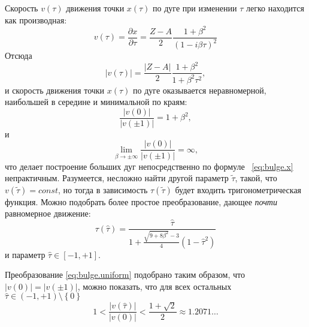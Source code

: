 Скорость $v(\tau)$
движения точки $x(\tau)$
по дуге при изменении $\tau$
легко находится как производная:
$$
v(\tau) =
  \frac{\partial x}{\partial \tau} =
  \frac{Z-A}{2}\frac{1+\beta^2}{\left(1 - i \beta \tau \right)^2}
$$
Отсюда
$$
|v(\tau)| =
  \frac{\left|Z-A\right|}{2}\frac{1+\beta^2}{1 + \beta^2 \tau^2}
  ,
$$
и скорость движения точки $x(\tau)$
по дуге оказывается неравномерной,
наибольшей в середине
и минимальной по краям:
$$
\frac{|v(0)|}{|v(\pm1)|} = 1+\beta^2
,
$$
и
$$
\lim_{\beta \to \pm \infty}
  \frac{|v(0)|}{|v(\pm1)|} =
  \infty
  ,
$$
что делает построение больших дуг непосредственно по формуле~
\eqref{eq:bulge.x}
непрактичным.
Разумеется,
несложно найти другой параметр
$\widetilde{\tau}$,
такой, что
$v(\widetilde{\tau}) = const$,
но тогда в зависимость
$\tau(\widetilde{\tau})$
будет входить тригонометрическая функция.
Можно подобрать более простое преобразование,
дающее
\textit{почти}
равномерное движение:
\begin{equation}
  \label{eq:bulge.uniform}
  \tau(\hat \tau) =
  \frac{\hat \tau}{1 + \frac{\sqrt{9+8\beta^2}-3}{4} \left(1 -  \hat \tau^2\right)}
\end{equation}
и параметр
$\hat \tau \in[-1,+1]$.

Преобразование
\eqref{eq:bulge.uniform}
подобрано таким образом,
что
$|v(0)|=|v(\pm 1)|$,
можно показать, что
для всех остальных
$
\hat \tau
  \in(-1, +1)
  \setminus \left\{0\right\}
$
$$
1 <
  \frac{|v(\hat \tau)|}{|v(0)|}
  <
  \frac{1+\sqrt{2}}{2}
  \approx 1.2071\dots
$$
